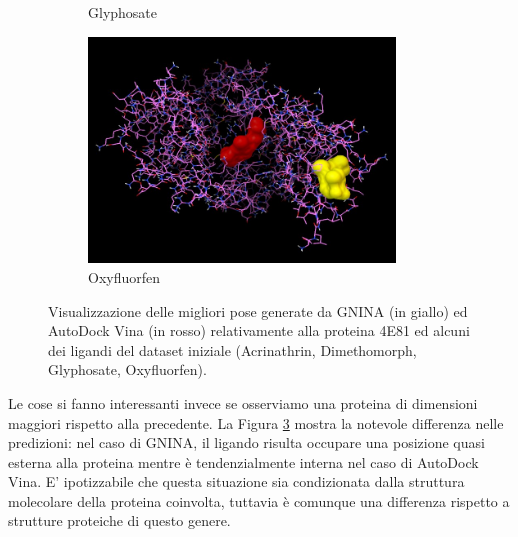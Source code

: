 \begin{figure}
\begin{subfigure}[b]{0.475\textwidth}
        \caption[]%
        {{\small Glyphosate}}    
        \label{fig:2h8v_glyphosate}
    \end{subfigure}
    \hfill
    \begin{subfigure}[b]{0.475\textwidth}   
        \centering 
        \includegraphics[width=\textwidth, height=6cm]{images/4e81_oxyfluorfen.jpg}
        \caption[]%
        {{\small Oxyfluorfen}}    
        \label{fig:2h8v_oxyfluorfen}
    \end{subfigure}
    \caption[Conformazioni proteina-ligando per la proteina 4E81. ]
    {\small Visualizzazione delle migliori pose generate da GNINA (in giallo) ed AutoDock Vina (in rosso) relativamente alla proteina 4E81 ed alcuni dei ligandi del dataset iniziale (Acrinathrin, Dimethomorph, Glyphosate, Oxyfluorfen).} 
    \label{fig:4e81}
\end{figure}



Le cose si fanno interessanti invece se osserviamo una proteina di dimensioni maggiori rispetto alla precedente. La Figura \ref{fig:4e81} mostra la notevole differenza nelle predizioni: nel caso di GNINA, il ligando risulta occupare una posizione quasi esterna alla proteina mentre è tendenzialmente interna nel caso di AutoDock Vina. E' ipotizzabile che questa situazione sia condizionata dalla struttura molecolare della proteina coinvolta, tuttavia è comunque una differenza rispetto a strutture proteiche di questo genere.


